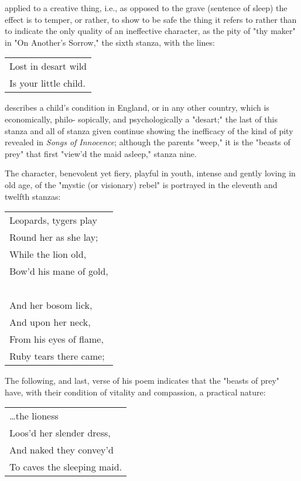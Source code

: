 \noindent applied to a creative thing, i.e., as opposed to the grave (sentence of sleep) the effect is to temper,
or rather, to show to be safe the thing it refers to rather than to indicate the only quality of an ineffective
character, as the pity of "thy maker" in "On Another's Sorrow," the sixth stanza, with the lines:\par
\begin{center}
	\begin{tabular}{l}
		Lost in desart wild \\
		Is your little child.
	\end{tabular}
\end{center}
describes a child's condition in England, or in any other country, which is 
economically, philo-\linebreak
sopically, and psychologically a "desart;" the last of this stanza and all
of stanza given continue showing the inefficacy of the kind of pity revealed in \textit{Songs of Innocence};
although the parents "weep," it is the "beasts of prey" that first "view'd the maid asleep," stanza nine.\par
\vspace*{0.5\baselineskip}
The character, benevolent yet fiery, playful in youth, intense and gently loving in old age, of the "mystic
(or visionary) rebel" is portrayed in the eleventh and twelfth stanzas:\par
\begin{center}
	\begin{tabular}{l}
		Leopards, tygers play   \\
		Round her as she lay;   \\
		While the lion old,     \\
		Bow'd his mane of gold, \\
		~                       \\
		And her bosom lick,     \\
		And upon her neck,      \\
		From his eyes of flame, \\
		Ruby tears there came;
	\end{tabular}
\end{center}
\hspace*{5mm}The following, and last, verse of his poem indicates that the "beasts of prey" have, with their
condition of vitality and compassion, a practical nature:\par
\begin{center}
	\begin{tabular}{l}
		\dots the lioness         \\
		Loos'd her slender dress, \\
		And naked they convey'd   \\
		To caves the sleeping maid.
	\end{tabular}
\end{center}
